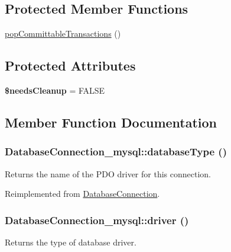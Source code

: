 \subsection*{Protected Member Functions}
\begin{DoxyCompactItemize}
\item 
\hyperlink{classDatabaseConnection__mysql_ad63915bedc73d668f05295b8572a33c0}{popCommittableTransactions} ()
\end{DoxyCompactItemize}
\subsection*{Protected Attributes}
\begin{DoxyCompactItemize}
\item 
\hypertarget{classDatabaseConnection__mysql_a4725a9f792e8c0c5e544eb0d2cc346cc}{
{\bfseries \$needsCleanup} = FALSE}
\label{classDatabaseConnection__mysql_a4725a9f792e8c0c5e544eb0d2cc346cc}

\end{DoxyCompactItemize}


\subsection{Member Function Documentation}
\hypertarget{classDatabaseConnection__mysql_a983f8932fcaa5f3806c78e28841e7a5b}{
\subsubsection[{databaseType}]{\setlength{\rightskip}{0pt plus 5cm}DatabaseConnection\_\-mysql::databaseType ()}}
\label{classDatabaseConnection__mysql_a983f8932fcaa5f3806c78e28841e7a5b}
Returns the name of the PDO driver for this connection. 

Reimplemented from \hyperlink{classDatabaseConnection_a7dd7e76bc813c6a90a6d26a5529d67b0}{DatabaseConnection}.\hypertarget{classDatabaseConnection__mysql_a84daa0617157e0c291b081c7c648dc05}{
\subsubsection[{driver}]{\setlength{\rightskip}{0pt plus 5cm}DatabaseConnection\_\-mysql::driver ()}}
\label{classDatabaseConnection__mysql_a84daa0617157e0c291b081c7c648dc05}
Returns the type of database driver.

